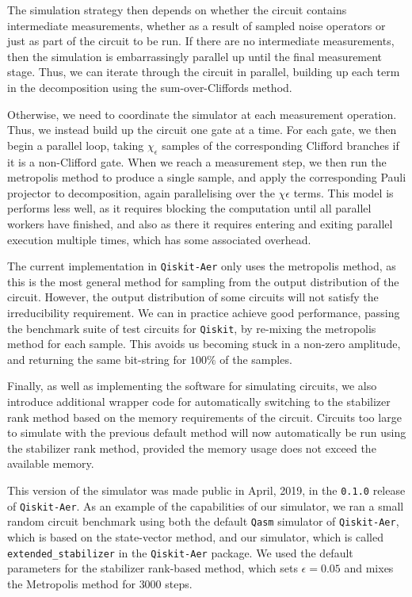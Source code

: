 The simulation strategy then depends on whether the circuit contains intermediate measurements, whether as a result of sampled noise operators or just as part of the circuit to be run. If there are no intermediate measurements, then the simulation is embarrassingly parallel up until the final measurement stage. Thus, we can iterate through the circuit in parallel, building up each term in the decomposition using the sum-over-Cliffords method.\par
Otherwise, we need to coordinate the simulator at each measurement operation. Thus, we instead build up the circuit one gate at a time. For each gate, we then begin a parallel loop, taking $\chi_{\epsilon}$ samples of the corresponding Clifford branches if it is a non-Clifford gate. When we reach a measurement step, we then run the metropolis method to produce a single sample, and apply the corresponding Pauli projector to decomposition, again parallelising over the $\chi{\epsilon}$ terms. This model is performs less well, as it requires blocking the computation until all parallel workers have finished, and also as there it requires entering and exiting parallel execution multiple times, which has some associated overhead.\par
The current implementation in \texttt{Qiskit-Aer} only uses the metropolis method, as this is the most general method for sampling from the output distribution of the circuit. However, the output distribution of some circuits will not satisfy the irreducibility requirement. We can in practice achieve good performance, passing the benchmark suite of test circuits for \texttt{Qiskit}, by re-mixing the metropolis method for each sample. This avoids us becoming stuck in a non-zero amplitude, and returning the same bit-string for $100\%$ of the samples.\par
Finally, as well as implementing the software for simulating circuits, we also introduce additional wrapper code for automatically switching to the stabilizer rank method based on the memory requirements of the circuit. Circuits too large to simulate with the previous default method will now automatically be run using the stabilizer rank method, provided the memory usage does not exceed the available memory.\par
This version of the simulator was made public in April, 2019, in the \texttt{0.1.0} release of \texttt{Qiskit-Aer}. As an example of the capabilities of our simulator, we ran a small random circuit benchmark using both the default \texttt{Qasm} simulator of \texttt{Qiskit-Aer}, which is based on the state-vector method, and our simulator, which is called \texttt{extended\_stabilizer} in the \texttt{Qiskit-Aer} package. We used the default parameters for the stabilizer rank-based method, which sets $\epsilon=0.05$ and mixes the Metropolis method for $3000$ steps.\par
